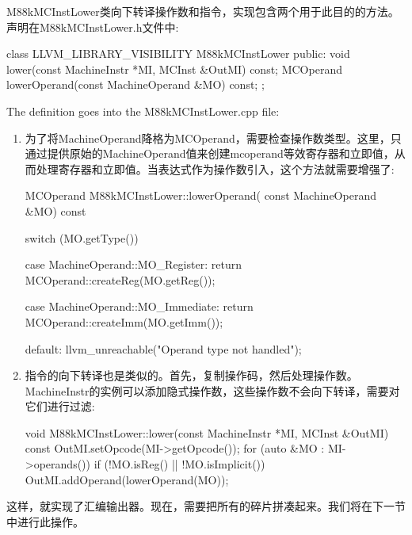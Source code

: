 M88kMCInstLower类向下转译操作数和指令，实现包含两个用于此目的的方法。声明在M88kMCInstLower.h文件中:

\begin{cpp}
class LLVM_LIBRARY_VISIBILITY M88kMCInstLower {
public:
    void lower(const MachineInstr *MI, MCInst &OutMI) const;
    MCOperand lowerOperand(const MachineOperand &MO) const;
};
\end{cpp}

The definition goes into the M88kMCInstLower.cpp file:

\begin{enumerate}
\item
为了将MachineOperand降格为MCOperand，需要检查操作数类型。这里，只通过提供原始的MachineOperand值来创建mcoperand等效寄存器和立即值，从而处理寄存器和立即值。当表达式作为操作数引入，这个方法就需要增强了:

\begin{cpp}
MCOperand M88kMCInstLower::lowerOperand(
        const MachineOperand &MO) const {
    switch (MO.getType()) {
    case MachineOperand::MO_Register:
        return MCOperand::createReg(MO.getReg());

    case MachineOperand::MO_Immediate:
        return MCOperand::createImm(MO.getImm());

    default:
        llvm_unreachable("Operand type not handled");
    }
}
\end{cpp}

\item
指令的向下转译也是类似的。首先，复制操作码，然后处理操作数。MachineInstr的实例可以添加隐式操作数，这些操作数不会向下转译，需要对它们进行过滤:

\begin{cpp}
void M88kMCInstLower::lower(const MachineInstr *MI,
MCInst &OutMI) const {
    OutMI.setOpcode(MI->getOpcode());
    for (auto &MO : MI->operands()) {
        if (!MO.isReg() || !MO.isImplicit())
            OutMI.addOperand(lowerOperand(MO));
    }
}
\end{cpp}
\end{enumerate}

这样，就实现了汇编输出器。现在，需要把所有的碎片拼凑起来。我们将在下一节中进行此操作。



















































